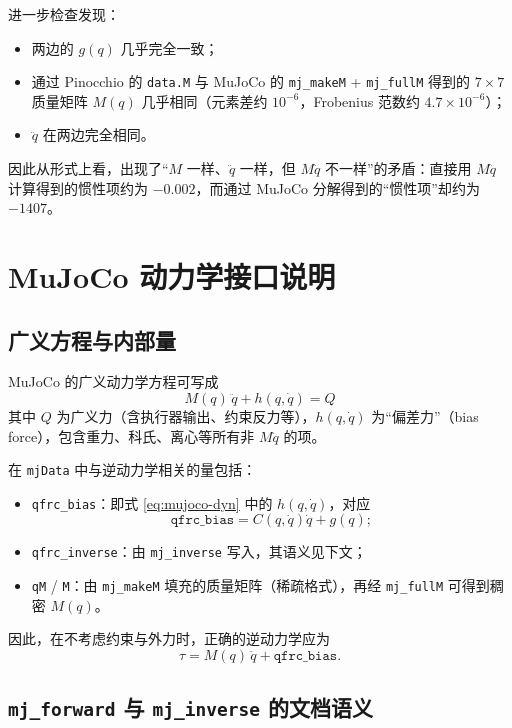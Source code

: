 \documentclass[12pt,a4paper]{article}
\begin{document}
进一步检查发现：
\begin{itemize}[leftmargin=*]
  \item 两边的 $g(q)$ 几乎完全一致；
  \item 通过 Pinocchio 的 \texttt{data.M} 与 MuJoCo 的 \texttt{mj\_makeM} + \texttt{mj\_fullM} 得到的 $7\times 7$ 质量矩阵 $M(q)$ 几乎相同（元素差约 $10^{-6}$，Frobenius 范数约 $4.7\times 10^{-6}$）；
  \item $\ddot{q}$ 在两边完全相同。
\end{itemize}

因此从形式上看，出现了“$M$ 一样、$\ddot{q}$ 一样，但 $M\ddot{q}$ 不一样”的矛盾：直接用 $M\ddot{q}$ 计算得到的惯性项约为 $-0.002$，而通过 MuJoCo 分解得到的“惯性项”却约为 $-1407$。

\section{MuJoCo 动力学接口说明}

\subsection{广义方程与内部量}

MuJoCo 的广义动力学方程可写成
\begin{equation}
  M(q)\,\ddot{q} + h(q,\dot{q}) = Q
  \label{eq:mujoco-dyn}
\end{equation}
其中 $Q$ 为广义力（含执行器输出、约束反力等），$h(q,\dot{q})$ 为“偏差力”（bias force），包含重力、科氏、离心等所有非 $M\ddot{q}$ 的项。

在 \texttt{mjData} 中与逆动力学相关的量包括：
\begin{itemize}[leftmargin=*]
  \item \texttt{qfrc\_bias}：即式 \eqref{eq:mujoco-dyn} 中的 $h(q,\dot{q})$，对应
  \[
    \texttt{qfrc\_bias} = C(q,\dot{q})\dot{q} + g(q);
  \]
  \item \texttt{qfrc\_inverse}：由 \texttt{mj\_inverse} 写入，其语义见下文；
  \item \texttt{qM} / \texttt{M}：由 \texttt{mj\_makeM} 填充的质量矩阵（稀疏格式），再经 \texttt{mj\_fullM} 可得到稠密 $M(q)$。
\end{itemize}

因此，在不考虑约束与外力时，正确的逆动力学应为
\begin{equation}
  \tau = M(q)\,\ddot{q} + \texttt{qfrc\_bias}.
  \label{eq:tau-correct}
\end{equation}

\subsection{\texttt{mj\_forward} 与 \texttt{mj\_inverse} 的文档语义}
\end{document}
